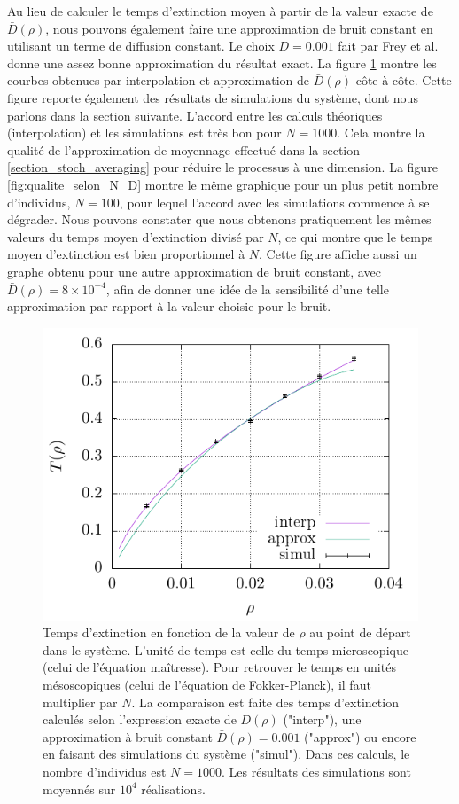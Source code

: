 \documentclass[openany,a4paper,12pt]{article}
\begin{document}
\par Au lieu de calculer le temps d'extinction moyen à partir de la valeur exacte de $\bar D(\rho)$, nous pouvons également faire une approximation de bruit constant en utilisant un terme de diffusion constant. Le choix $D=0.001$ fait par Frey et al. \cite{frey2012} donne une assez bonne approximation du résultat exact. La figure \ref{fig:T_extc} montre les courbes obtenues par interpolation et approximation de $\bar D(\rho)$ côte à côte. Cette figure reporte également des résultats de simulations du système, dont nous parlons dans la section suivante. L'accord entre les calculs théoriques (interpolation) et les simulations est très bon pour $N=1000$. Cela montre la qualité de l'approximation de moyennage effectué dans la section \ref{section_stoch_averaging} pour réduire le processus à une dimension. La figure \ref{fig:qualite_selon_N_D} montre le même graphique pour un plus petit nombre d'individus, $N=100$, pour lequel l'accord avec les simulations commence à se dégrader. Nous pouvons constater que nous obtenons pratiquement les mêmes valeurs du temps moyen d'extinction divisé par $N$, ce qui montre que le temps moyen d'extinction est bien proportionnel à $N$. Cette figure affiche aussi un graphe obtenu pour une autre approximation de bruit constant, avec $\bar D(\rho) = 8\times 10^{-4}$, afin de donner une idée de la sensibilité d'une telle approximation par rapport à la valeur choisie pour le bruit. 

\begin{figure}[t]
	\centering
	\includegraphics[width=0.9\linewidth]{figures/extc_time_comparison}
	\caption{Temps d'extinction en fonction de la valeur de $\rho$ au point de départ dans le système. L'unité de temps est celle du temps microscopique (celui de l'équation maîtresse). Pour retrouver le temps en unités mésoscopiques (celui de l'équation de Fokker-Planck), il faut multiplier par $N$. La comparaison est faite des temps d'extinction calculés selon l'expression exacte de $\bar D(\rho)$ ("interp"), une approximation à bruit constant $\bar D(\rho)=0.001$ ("approx") ou encore en faisant des simulations du système ("simul"). Dans ces calculs, le nombre d'individus est $N=1000$. Les résultats des simulations sont moyennés sur $10^4$ réalisations.}
	\label{fig:T_extc}
\end{figure}
\end{document}
